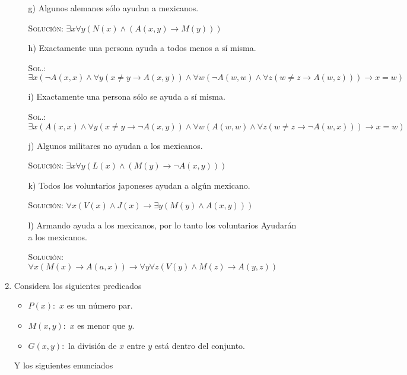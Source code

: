 \documentclass[letterpaper,11pt]{article}
\begin{document}
\begin{enumerate}
\begin{itemize}
        \item[g)] Algunos alemanes sólo ayudan a mexicanos.

        \textsc{Solución:} $∃x ∀y (N(x) \land (A(x, y) → M(y)))$

        \item[h)] Exactamente una persona ayuda a todos menos a sí misma.

        \textsc{Sol.:} $∃x (\neg A(x, x) \land ∀y (x \neq y → A(x,y)) \land 
        ∀w (\neg A(w, w) \land ∀z (w \neq z → A(w,z))) → x = w)$

        \item[i)] Exactamente una persona sólo se ayuda a sí misma.

        \textsc{Sol.:} $∃x (A(x, x) \land ∀y (x \neq y → \neg A(x, y)) \land 
        ∀w(A(w, w) \land ∀z(w \neq z → \neg A(w, x))) → x = w)$

        \item[j)] Algunos militares no ayudan a los mexicanos.

        \textsc{Solución:} $∃x ∀y (L(x) \land (M(y) → \neg A(x, y)))$

        \item[k)] Todos los voluntarios japoneses ayudan a algún mexicano. 

        \textsc{Solución:} $∀x (V(x) \land J(x) → ∃y (M(y) \land A(x, y)))$

        \item[l)] Armando ayuda a los mexicanos, por lo tanto los voluntarios
        Ayudarán a los mexicanos. 

        \textsc{Solución:} $∀x (M(x) → A(a, x)) → ∀y ∀z (V(y) \land 
        M(z) → A(y, z))$
    \end{itemize}

    \item Considera los siguientes predicados 

    \begin{itemize}
        \item $P(x):$ $x$ es un número par.
        \item $M(x, y):$ $x$ es menor que $y$.
        \item $G(x, y):$ la división de $x$ entre $y$ está dentro del conjunto.
    \end{itemize}

    Y los siguientes enunciados


\end{enumerate}
\end{document}
